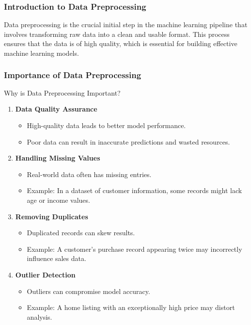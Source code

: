 \documentclass[aspectratio=169]{beamer}
\begin{document}
\frame{\titlepage}

\begin{frame}[fragile]
    \frametitle{Introduction to Data Preprocessing}
    Data preprocessing is the crucial initial step in the machine learning pipeline that involves transforming raw data into a clean and usable format. This process ensures that the data is of high quality, which is essential for building effective machine learning models.
\end{frame}

\begin{frame}[fragile]
    \frametitle{Importance of Data Preprocessing}
    \begin{block}{Why is Data Preprocessing Important?}
        \begin{enumerate}
            \item \textbf{Data Quality Assurance}
            \begin{itemize}
                \item High-quality data leads to better model performance.
                \item Poor data can result in inaccurate predictions and wasted resources.
            \end{itemize}

            \item \textbf{Handling Missing Values}
            \begin{itemize}
                \item Real-world data often has missing entries. 
                \item Example: In a dataset of customer information, some records might lack age or income values.
            \end{itemize}

            \item \textbf{Removing Duplicates}
            \begin{itemize}
                \item Duplicated records can skew results.
                \item Example: A customer’s purchase record appearing twice may incorrectly influence sales data.
            \end{itemize}

            \item \textbf{Outlier Detection}
            \begin{itemize}
                \item Outliers can compromise model accuracy.
                \item Example: A home listing with an exceptionally high price may distort analysis.
            \end{itemize}
        \end{enumerate}
    \end{block}
\end{frame}
\end{document}
